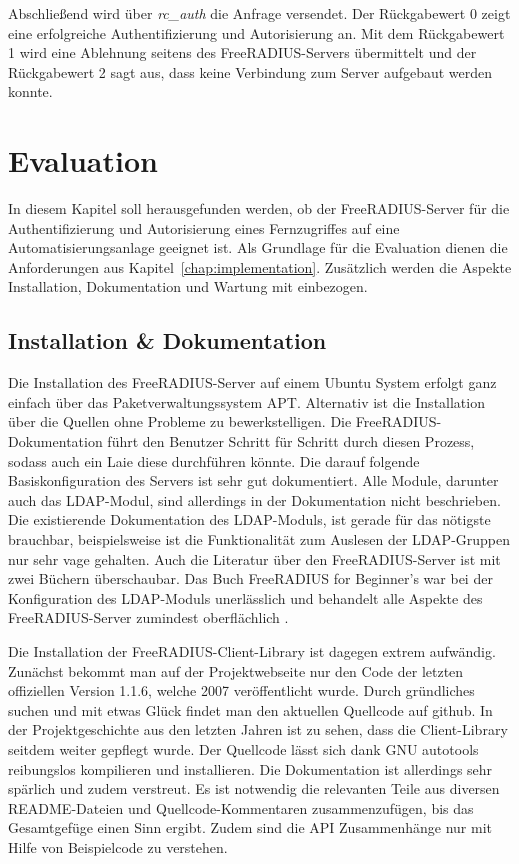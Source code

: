 \documentclass[11pt,a4paper]{report}
\begin{document}
Abschließend wird über \textit{rc\_auth} die Anfrage versendet. Der Rückgabewert 0 zeigt eine erfolgreiche Authentifizierung und Autorisierung an. Mit dem Rückgabewert 1 wird eine Ablehnung seitens des FreeRADIUS-Servers übermittelt und der Rückgabewert 2 sagt aus, dass keine Verbindung zum Server aufgebaut werden konnte.

\chapter{Evaluation} \label{chap:evaluation}

In diesem Kapitel soll herausgefunden werden, ob der FreeRADIUS-Server für die Authentifizierung und Autorisierung eines Fernzugriffes auf eine Automatisierungsanlage geeignet ist. Als Grundlage für die Evaluation dienen die Anforderungen aus Kapitel~\ref{chap:implementation}. Zusätzlich werden die Aspekte Installation, Dokumentation und Wartung mit einbezogen.

\section{Installation \& Dokumentation}

Die Installation des FreeRADIUS-Server auf einem Ubuntu System erfolgt ganz einfach über das Paketverwaltungssystem APT. Alternativ ist die Installation über die Quellen ohne Probleme zu bewerkstelligen. Die FreeRADIUS-Dokumentation führt den Benutzer Schritt für Schritt durch diesen Prozess, sodass auch ein Laie diese durchführen könnte. Die darauf folgende Basiskonfiguration des Servers ist sehr gut dokumentiert. Alle Module, darunter auch das LDAP-Modul, sind allerdings in der Dokumentation nicht beschrieben. Die existierende Dokumentation des LDAP-Moduls, ist gerade für das nötigste brauchbar, beispielsweise ist die Funktionalität zum Auslesen der LDAP-Gruppen nur sehr vage gehalten. Auch die Literatur über den FreeRADIUS-Server ist mit zwei Büchern  überschaubar. Das Buch FreeRADIUS for Beginner's war bei der Konfiguration des LDAP-Moduls unerlässlich und behandelt alle Aspekte des FreeRADIUS-Server zumindest oberflächlich \cite{walt}. 

Die Installation der FreeRADIUS-Client-Library ist dagegen extrem aufwändig. Zunächst bekommt man auf der Projektwebseite nur den Code der letzten offiziellen Version 1.1.6, welche 2007 veröffentlicht wurde. Durch gründliches suchen und mit etwas Glück findet man den aktuellen Quellcode auf github. In der Projektgeschichte aus den letzten Jahren ist zu sehen, dass die Client-Library seitdem weiter gepflegt wurde. Der Quellcode lässt sich dank GNU autotools reibungslos kompilieren und installieren. Die Dokumentation ist allerdings sehr spärlich und zudem verstreut. Es ist notwendig die relevanten Teile aus diversen README-Dateien und Quellcode-Kommentaren zusammenzufügen, bis das Gesamtgefüge einen Sinn ergibt. Zudem sind die API Zusammenhänge nur mit Hilfe von Beispielcode zu verstehen.
\end{document}
